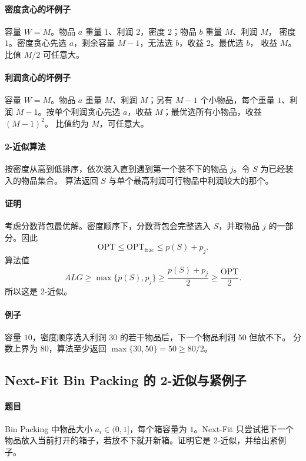 \documentclass[UTF8,openany,12pt]{ctexbook}
\theoremstyle{remark}
\newcommand{\OPT}{\mathrm{OPT}}
\begin{document}
\paragraph{密度贪心的坏例子}
容量 $W=M$。物品 $a$ 重量 $1$、利润 $2$，密度 $2$；物品 $b$ 重量 $M$、利润 $M$，
密度 $1$。密度贪心先选 $a$，剩余容量 $M-1$，无法选 $b$，收益 $2$。最优选 $b$，
收益 $M$。比值 $M/2$ 可任意大。

\paragraph{利润贪心的坏例子}
容量 $W=M$。物品 $a$ 重量 $M$、利润 $M$；另有 $M-1$ 个小物品，每个重量 $1$、利润
$M-1$。按单个利润贪心先选 $a$，收益 $M$；最优选所有小物品，收益 $(M-1)^2$。
比值约为 $M$，可任意大。

\paragraph{2-近似算法}
按密度从高到低排序，依次装入直到遇到第一个装不下的物品 $j$。令 $S$ 为已经装入的物品集合。
算法返回 $S$ 与单个最高利润可行物品中利润较大的那个。

\paragraph{证明}
考虑分数背包最优解。密度顺序下，分数背包会完整选入 $S$，并取物品 $j$ 的一部分。因此
\[
  \OPT\le \OPT_{\mathrm{frac}}\le p(S)+p_j.
\]
算法值
\[
  ALG\ge \max\{p(S),p_j\}\ge \frac{p(S)+p_j}{2}\ge \frac{\OPT}{2}.
\]
所以这是 2-近似。

\paragraph{例子}
容量 $10$，密度顺序选入利润 $30$ 的若干物品后，下一个物品利润 $50$ 但放不下。
分数上界为 $80$，算法至少返回 $\max\{30,50\}=50\ge80/2$。

\subsection{Next-Fit Bin Packing 的 2-近似与紧例子}

\paragraph{题目}
Bin Packing 中物品大小 $a_i\in(0,1]$，每个箱容量为 $1$。Next-Fit 只尝试把下一个物品放入当前打开的箱子，若放不下就开新箱。证明它是 2-近似，并给出紧例子。
\end{document}
